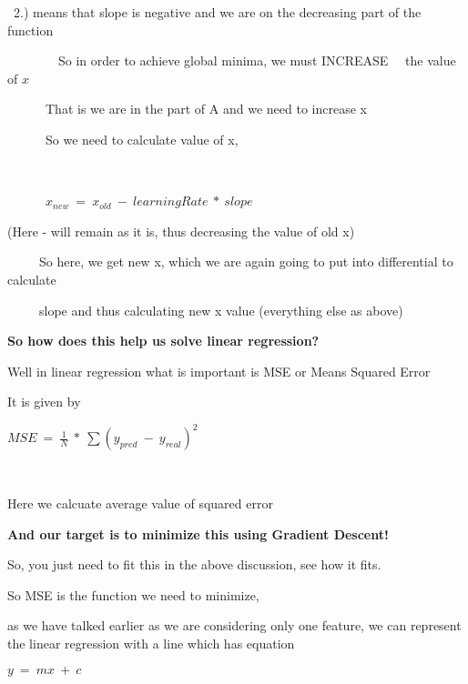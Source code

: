  	 \ 2.) means that slope is negative and we are on the decreasing part of the function 

 \ \ 	 \ \ \ \ \ \ So in order to achieve global minima, we must INCREASE \ \ the value of $\displaystyle x$ 

	 \ \ \ \ \ \ That is we are in the part of A and we need to increase x 

	 \ \ \ \ \ \ So we need to calculate value of x,

 \ \ \ \ \ \ \ \ \ \ \ \ \ \ \ \ 

	 \ \ \ \ \ \ $\displaystyle x_{new} \ =\ x_{old} \ -\ learningRate\ *\ slope$ \ \ \ \ \ \ \ \ 

		(Here - will remain as it is, thus decreasing the value of old x)

	

	 \ \ \ \ \ So here, we get new x, which we are again going to put into differential to calculate

	 \ \ \ \ \ slope and thus calculating new x value (everything else as above)











\textbf{So how does this help us solve linear regression?}



Well in linear regression what is important is MSE or Means Squared Error 

It is given by 



$\displaystyle MSE\ =\ \frac{1}{N} \ *\ \sum ( y_{pred} \ -\ y_{real})^{2}$

	 \ \ \ \ \ \ 

Here we calcuate average value of squared error 



\textbf{And our target is to minimize this using Gradient Descent!}



So, you just need to fit this in the above discussion, see how it fits.



So MSE is the function we need to minimize,

as we have talked earlier as we are considering only one feature, we can represent the linear regression with a line which has equation

	$\displaystyle y\ =\ mx\ +\ c$



